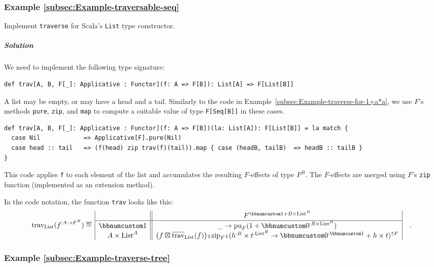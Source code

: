 \subsubsection{Example \label{subsec:Example-traversable-seq}\ref{subsec:Example-traversable-seq}}

Implement \lstinline!traverse! for Scala\textsf{'}s \lstinline!List! type
constructor. 

\subparagraph{Solution}

We need to implement the following type signature:
\begin{lstlisting}
def trav[A, B, F[_]: Applicative : Functor](f: A => F[B]): List[A] => F[List[B]]
\end{lstlisting}
A list may be empty, or may have a head and a tail. Similarly to the
code in Example~\ref{subsec:Example-traverse-for-1+a*a}, we use
$F$\textsf{'}s methods \lstinline!pure!, \lstinline!zip!, and \lstinline!map!
to compute a suitable value of type \lstinline!F[Seq[B]]! in these
cases.
\begin{lstlisting}
def trav[A, B, F[_]: Applicative : Functor](f: A => F[B])(la: List[A]): F[List[B]] = la match {
  case Nil            => Applicative[F].pure(Nil)
  case head :: tail   => (f(head) zip trav(f)(tail)).map { case (headB, tailB)  => headB :: tailB }
}
\end{lstlisting}
This code applies \lstinline!f! to each element of the list and accumulates
the resulting $F$-effects of type $F^{B}$. The $F$-effects are
merged using $F$\textsf{'}s \lstinline!zip! function (implemented as an extension
method).

In the code notation, the function \lstinline!trav! looks like this:
\[
\text{trav}_{\text{List}}(f^{:A\rightarrow F^{B}})\triangleq\,\begin{array}{|c||c|}
 & F^{\bbnum 1+B\times\text{List}^{B}}\\
\hline \bbnum 1 & \_\rightarrow\text{pu}_{F}(1+\bbnum 0^{:B\times\text{List}^{B}})\\
A\times\text{List}^{A} & \big(f\boxtimes\overline{\text{trav}}_{\text{List}}(f)\big)\bef\text{zip}_{F}\bef(h^{:B}\times t^{:\text{List}^{B}}\rightarrow\bbnum 0^{:\bbnum 1}+h\times t)^{\uparrow F}
\end{array}\quad.
\]


\subsubsection{Example \label{subsec:Example-traverse-tree}\ref{subsec:Example-traverse-tree}}

